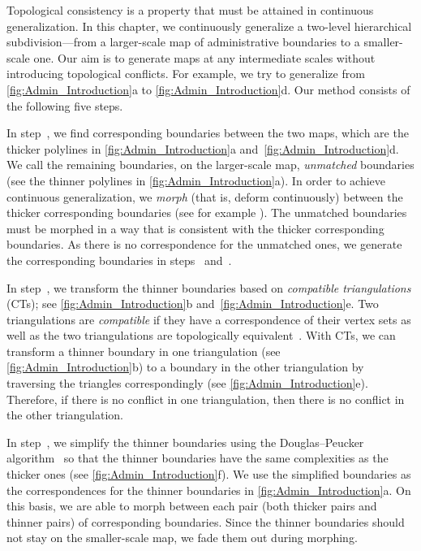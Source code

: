 Topological consistency is a property 
that must be attained in continuous generalization. 
In this chapter, we continuously generalize 
a two-level hierarchical subdivision---from 
a larger-scale map of administrative boundaries 
to a smaller-scale one.  
Our aim is to generate maps at any intermediate scales
without introducing topological conflicts.
For example, we try to generalize from
\fig\ref{fig:Admin_Introduction}a to
\fig\ref{fig:Admin_Introduction}d.
Our method consists of the following five steps.  

In step~, we find corresponding boundaries
between the two maps,
which are the thicker polylines in
\figs\ref{fig:Admin_Introduction}a 
and~\ref{fig:Admin_Introduction}d.  
We call the remaining boundaries, on the larger-scale map, 
\emph{unmatched} boundaries (see the
thinner polylines in \fig\ref{fig:Admin_Introduction}a). 
In order to achieve continuous generalization, 
we \emph{morph} (that is, deform continuously) 
between the thicker corresponding boundaries 
(see for example \textcite{Noellenburg2008}).
The unmatched boundaries must be morphed in a way 
that is consistent with the thicker corresponding boundaries.  
As there is no correspondence for the unmatched ones, 
we generate the corresponding boundaries 
in steps~ and~.

In step~, we transform the thinner boundaries 
based on \emph{compatible triangulations} (CTs); 
see \figs\ref{fig:Admin_Introduction}b 
and~\ref{fig:Admin_Introduction}e. 
Two triangulations are \emph{compatible} 
if they have a correspondence of their vertex sets as well as 
the two triangulations are topologically 
equivalent~\parencite{Surazhsky2001}. 
With CTs, 
we can transform a thinner boundary in one triangulation 
(see \fig\ref{fig:Admin_Introduction}b) 
to a boundary in the other triangulation 
by traversing the triangles correspondingly 
(see \fig\ref{fig:Admin_Introduction}e). 
Therefore, if there is no conflict in one triangulation, 
then there is no conflict in the other triangulation.
 

In step~, we simplify the thinner boundaries using
the Douglas--Peucker algorithm~\parencite{Douglas1973} 
so that the thinner boundaries 
have the same complexities as the thicker ones 
(see \fig\ref{fig:Admin_Introduction}f). 
We use the simplified boundaries as the correspondences for 
the thinner boundaries in \fig\ref{fig:Admin_Introduction}a. 
On this basis, we are able to morph between
each pair (both thicker pairs and thinner pairs) of 
corresponding boundaries.
Since the thinner boundaries should not stay
on the smaller-scale map, 
we fade them out during morphing. 

